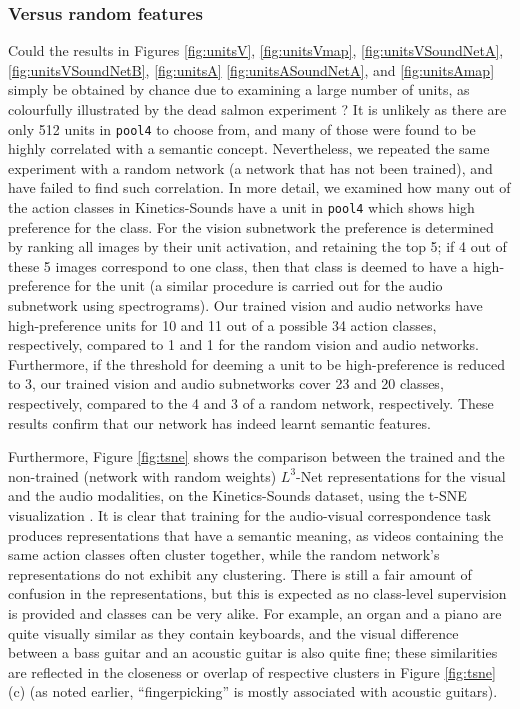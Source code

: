 \documentclass[10pt,twocolumn,letterpaper]{article}
\begin{document}
\figUnitsVSoundNetB
\figUnitsA
\figUnitsASoundNetA

\afterpage{\FloatBarrier}


\subsubsection{Versus random features}
Could the results in Figures
\ref{fig:unitsV},
\ref{fig:unitsVmap},
\ref{fig:unitsVSoundNetA},
\ref{fig:unitsVSoundNetB},
\ref{fig:unitsA}
\ref{fig:unitsASoundNetA},
and
\ref{fig:unitsAmap}
simply be obtained by chance due to examining a large number of units,
as colourfully illustrated by the dead salmon experiment
\cite{Bennett09}?  It is unlikely as there are only 512 units in
\texttt{pool4} to choose from, and many of those were found to be
highly correlated with a semantic concept. Nevertheless, we repeated
the same experiment with a random network (\ie a network that has not
been trained), and have failed to find such correlation.  In more
detail, we examined how many out of the action classes in
Kinetics-Sounds have a unit in \texttt{pool4} which shows high
preference for the class. For the vision subnetwork the preference is
determined by ranking all images by their unit activation, and
retaining the top 5; if 4 out of these 5 images correspond to
one class, then that class is deemed to have a high-preference for the
unit (a similar procedure is carried out for the audio subnetwork
using spectrograms).  Our trained vision and audio networks have
high-preference units for 10 and 11 out of a possible 34 action
classes, respectively, compared to 1 and 1 for the random vision and
audio networks.  Furthermore, if the threshold for deeming a unit to
be high-preference is reduced to 3, our trained vision and audio
subnetworks cover 23 and 20 classes, respectively, compared to the 4
and 3 of a random network, respectively.  These results confirm that
our network has indeed learnt semantic features.

Furthermore,
Figure \ref{fig:tsne} shows the comparison between the trained and the
non-trained (\ie network with random weights) $L^3$-Net representations
for the visual and the audio modalities, on the Kinetics-Sounds dataset,
using the t-SNE visualization \cite{Van-der-Maaten08}.
It is clear that training for the audio-visual correspondence task
produces representations that have a semantic meaning, as videos containing
the same action classes
%
%
often cluster together, while the random network's representations do not
exhibit any clustering.
There is still a fair amount of confusion in the representations,
but this is expected as no class-level supervision is provided
and classes can be very alike.
For example, an organ and a piano are quite visually similar as they
contain keyboards, and the visual difference between a bass guitar and an
acoustic guitar is also quite fine; these similarities are reflected
in the closeness or overlap of respective clusters in
Figure \ref{fig:tsne}(c)
(\eg as noted earlier, ``fingerpicking'' is mostly associated with acoustic guitars).
\end{document}
